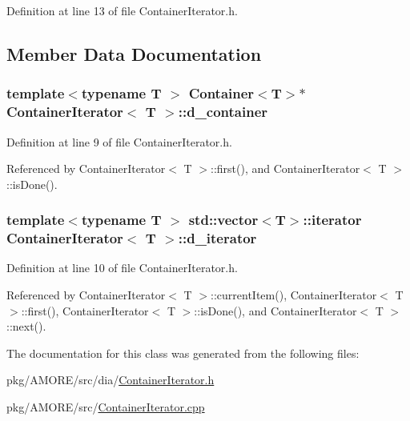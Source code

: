 Definition at line 13 of file ContainerIterator.h.



\subsection{Member Data Documentation}
\hypertarget{class_container_iterator_a572dccca78e6c158c4366c13a4447be5}{
\subsubsection[{d\_\-container}]{\setlength{\rightskip}{0pt plus 5cm}template$<$typename T $>$ {\bf Container}$<$T$>$$\ast$ {\bf ContainerIterator}$<$ T $>$::{\bf d\_\-container}}}
\label{class_container_iterator_a572dccca78e6c158c4366c13a4447be5}


Definition at line 9 of file ContainerIterator.h.



Referenced by ContainerIterator$<$ T $>$::first(), and ContainerIterator$<$ T $>$::isDone().

\hypertarget{class_container_iterator_a129eade25e86d86d07e1bbb29dd961d6}{
\subsubsection[{d\_\-iterator}]{\setlength{\rightskip}{0pt plus 5cm}template$<$typename T $>$ std::vector$<$T$>$::iterator {\bf ContainerIterator}$<$ T $>$::{\bf d\_\-iterator}}}
\label{class_container_iterator_a129eade25e86d86d07e1bbb29dd961d6}


Definition at line 10 of file ContainerIterator.h.



Referenced by ContainerIterator$<$ T $>$::currentItem(), ContainerIterator$<$ T $>$::first(), ContainerIterator$<$ T $>$::isDone(), and ContainerIterator$<$ T $>$::next().



The documentation for this class was generated from the following files:\begin{DoxyCompactItemize}
\item 
pkg/AMORE/src/dia/\hyperlink{_container_iterator_8h}{ContainerIterator.h}\item 
pkg/AMORE/src/\hyperlink{_container_iterator_8cpp}{ContainerIterator.cpp}\end{DoxyCompactItemize}
